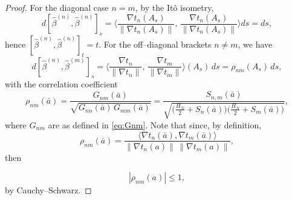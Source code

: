 \documentclass[12pt,reqno]{amsart}
\theoremstyle{plain}
\theoremstyle{definition}
\theoremstyle{remark}
\begin{document}
\begin{proof} For the diagonal case $n=m$, by the It\^o isometry,
\begin{equation}
d[\hat\beta^{(n)},\hat\beta^{(n)}]_s
=\Big\langle \frac{\nabla t_n(A_s)}{\|\nabla t_n(A_s)\|},\,
          \frac{\nabla t_n(A_s)}{\|\nabla t_n(A_s)\|}\Big\rangle ds
= ds,
\end{equation}
hence $[\hat\beta^{(n)},\hat\beta^{(n)}]_t=t$. For the off–diagonal brackets $n\neq m$, we have 
\begin{equation}\label{eq:rho}
d[\hat\beta^{(n)},\hat\beta^{(m)}]_s
=\Big\langle \frac{\nabla t_n}{\|\nabla t_n\|},\,
              \frac{\nabla t_m}{\|\nabla t_m\|}\Big\rangle (A_s)\,ds
=\rho_{nm}(A_s)\,ds,
\end{equation}
with the correlation coefficient
\begin{equation} 
\rho_{nm}(\bar{a})=\frac{G_{nm}(\bar{a})}{\sqrt{G_{nn}(\bar{a})\,G_{mm}(\bar{a})}}
=\frac{S_{n,m}(\bar{a})}{\sqrt{\bigl(\tfrac{H_N}{2}+S_n(\bar{a})\bigr)
                       \bigl(\tfrac{H_N}{2}+S_m(\bar{a})\bigr)}} ,
\end{equation} 
where $G_{nm}$ are as defined in \eqref{eq:Gnm}. Note that since, by definition, 
\begin{equation} 
\label{eq:rho}
\rho_{nm}(\bar{a})=\frac{\langle \nabla t_n(\bar{a}),\nabla t_m(\bar{a}) \rangle}{\|\nabla t_n(a)\|\,\|\nabla t_m(a) \|},
\end{equation}
then 

\begin{equation} \label{eq:rhoCS} |\rho_{nm}(a)|\le 1,
\end{equation} by Cauchy–Schwarz. 


\end{proof}
\end{document}
